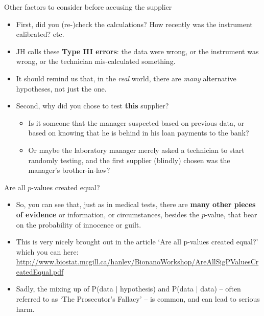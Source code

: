 \documentclass[10pt]{beamer}\usepackage[]{graphicx}\usepackage[]{color}
\begin{document}
\begin{frame}{Other factors to consider before accusing the supplier}
	\begin{itemize}
		\small
		\setlength\itemsep{1em}
		\item First, did you (re-)check the calculations?  How recently was the instrument 
		calibrated? etc. \pause 
		\item JH calls these \textbf{Type III errors}: the data were wrong, or the
		instrument was wrong, or the technician mis-calculated something. 
		\item It should remind us that, in the \textit{real} world, there are \textit{many} alternative hypotheses, not just the one.
		\pause 
		\item Second, why did you chose to test \textbf{this} supplier? \pause
		\begin{itemize}
			\item Is it someone that the manager suspected based on previous data, or based on knowing that he is behind in his loan payments to the bank? 
			\item Or maybe the laboratory manager merely asked a technician to start randomly testing, and the first supplier (blindly) chosen was the manager's brother-in-law?
		\end{itemize}
	\end{itemize}
\end{frame}



\begin{frame}{Are all $p$-values created equal?}
	\begin{itemize}
		\small
		\setlength\itemsep{1em}
		\item So, you can see that, just as in medical tests, there are\textbf{ many other pieces of evidence} or information, or circumstances, besides the $p$-value, that bear on the probability of innocence or guilt.
		\item This is very nicely brought out in the article `Are all p-values created equal?' which you can
		here: { \footnotesize \url{http://www.biostat.mcgill.ca/hanley/BionanoWorkshop/AreAllSigPValuesCreatedEqual.pdf}}
		
		\item Sadly, the mixing up of P(data $|$ hypothesis) and P(data $|$ data) -- often referred to as
		`The Prosecutor's Fallacy' -- is  common, and can lead to serious harm. 
	\end{itemize}
\end{frame}
\end{document}
